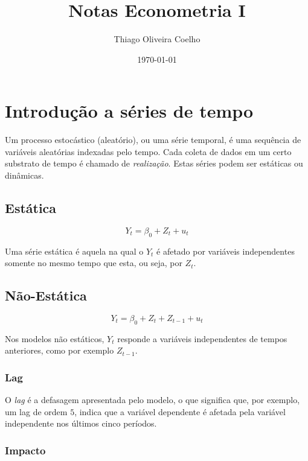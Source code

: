 \documentclass[12pt,a4paper,oneside,brazil]{abntex2}
\title{Notas Econometria I}
\author{Thiago Oliveira Coelho}
\date{\today}
\begin{document}
\pagestyle{plain}

\maketitle

\tableofcontents

\chapter{Introdução a séries de tempo}

Um processo estocástico (aleatório), ou uma série temporal, é uma sequência de variáveis aleatórias indexadas pelo tempo. Cada coleta de dados em um certo substrato de tempo é chamado de \emph{realização}. Estas séries podem ser estáticas ou dinâmicas.

\section{Estática}

\begin{equation}
 Y_t = \beta_0 + Z_t + u_t
\end{equation}

Uma série estática é aquela na qual o $Y_t$ é afetado por variáveis independentes somente no mesmo tempo que esta, ou seja, por $Z_t$.

\section{Não-Estática}

\begin{equation}
 Y_t = \beta_0 + Z_t + Z_{t-1} + u_t
\end{equation}
  
Nos modelos não estáticos, $Y_t$ responde a variáveis independentes de tempos anteriores, como por exemplo $Z_{t-1}$.

\subsection{Lag}
O \emph{lag} é a defasagem apresentada pelo modelo, o que significa que, por exemplo, um lag de ordem $5$, indica que a variável dependente é afetada pela variável independente nos últimos cinco períodos.

\subsection{Impacto}
\end{document}

